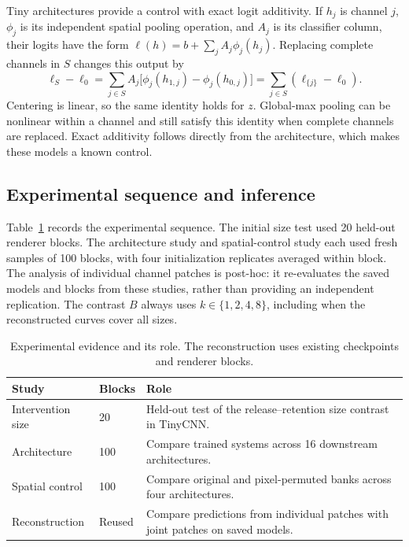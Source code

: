 \documentclass[pdflatex,sn-basic]{sn-jnl}
\begin{document}
Tiny architectures provide a control with exact logit additivity. If $h_j$ is channel $j$, $\phi_j$ is its independent spatial pooling operation, and $A_j$ is its classifier column, their logits have the form $\ell(h)=b+\sum_j A_j\phi_j(h_j)$. Replacing complete channels in $S$ changes this output by
\begin{equation}
\ell_S-\ell_0
=\sum_{j\in S}A_j\bigl[\phi_j(h_{1,j})-\phi_j(h_{0,j})\bigr]
=\sum_{j\in S}(\ell_{\{j\}}-\ell_0).
\label{eq:tiny-additivity}
\end{equation}
Centering is linear, so the same identity holds for $z$. Global-max pooling can be nonlinear within a channel and still satisfy this identity when complete channels are replaced. Exact additivity follows directly from the architecture, which makes these models a known control.

\subsection{Experimental sequence and inference}

Table~\ref{tab:studies} records the experimental sequence. The initial size test used 20 held-out renderer blocks. The architecture study and spatial-control study each used fresh samples of 100 blocks, with four initialization replicates averaged within block. The analysis of individual channel patches is post-hoc: it re-evaluates the saved models and blocks from these studies, rather than providing an independent replication. The contrast $B$ always uses $k\in\{1,2,4,8\}$, including when the reconstructed curves cover all sizes.

\begin{table}[t]
\caption{Experimental evidence and its role. The reconstruction uses existing checkpoints and renderer blocks.}
\label{tab:studies}
\centering
\begin{tabular}{@{}llp{}@{}}
\toprule
Study & Blocks & Role \\
\midrule
Intervention size & 20 & Held-out test of the release--retention size contrast in TinyCNN. \\
Architecture & 100 & Compare trained systems across 16 downstream architectures. \\
Spatial control & 100 & Compare original and pixel-permuted banks across four architectures. \\
Reconstruction & Reused & Compare predictions from individual patches with joint patches on saved models. \\
\bottomrule
\end{tabular}
\end{table}
\end{document}
